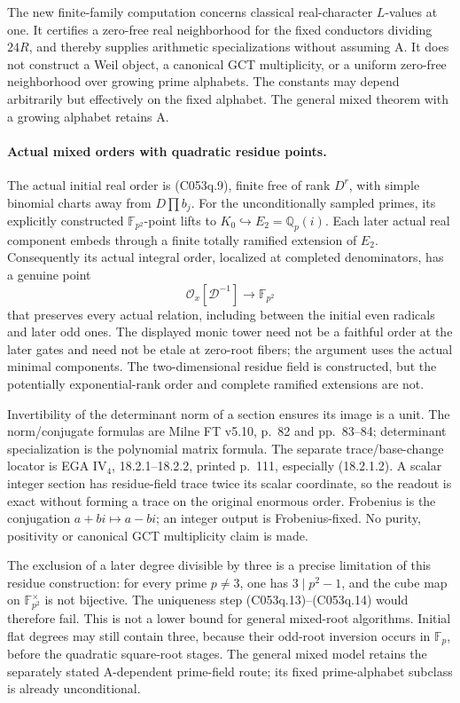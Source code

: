 \begin{geometricstatement}[NN-C053]
The new finite-family computation concerns classical
real-character \(L\)-values at one. It certifies a
zero-free real neighborhood for the fixed conductors
dividing \(24R\), and thereby supplies arithmetic
specializations without assuming A. It does not
construct a Weil object, a canonical GCT multiplicity,
or a uniform zero-free neighborhood over growing
prime alphabets. The constants may depend arbitrarily
but effectively on the fixed alphabet. The general
mixed theorem with a growing alphabet retains A.

\paragraph{Actual mixed orders with quadratic residue points.}
The actual initial real order is (C053q.9), finite
free of rank \(D^r\), with simple binomial charts
away from \(D\prod b_j\). For the unconditionally
sampled primes, its explicitly constructed
\(\mathbb F_{p^2}\)-point lifts to
\(K_0\hookrightarrow E_2=\mathbb Q_p(i)\).
Each later actual real component embeds through
a finite totally ramified extension of \(E_2\).
Consequently its actual integral order, localized
at completed denominators, has a genuine point
\[
             \mathcal O_x[\mathcal D^{-1}]
                           \longrightarrow\mathbb F_{p^2}
                                                               \tag{C053q.17}
\]
that preserves every actual relation, including
between the initial even radicals and later odd
ones. The displayed monic tower need not be a
faithful order at the later gates and need not
be etale at zero-root fibers; the argument uses
the actual minimal components. The two-dimensional
residue field is constructed, but the potentially
exponential-rank order and complete ramified
extensions are not.

Invertibility of the determinant norm of a section
ensures its image is a unit. The norm/conjugate
formulas are Milne FT v5.10, p.~82 and pp.~83--84;
determinant specialization is the polynomial
matrix formula. The separate trace/base-change
locator is EGA IV$_4$, 18.2.1--18.2.2, printed
p.~111, especially (18.2.1.2). A scalar integer
section has residue-field trace twice its scalar
coordinate, so the readout is exact without
forming a trace on the original enormous order.
Frobenius is the conjugation \(a+bi\mapsto a-bi\);
an integer output is Frobenius-fixed. No purity,
positivity or canonical GCT multiplicity claim
is made.

The exclusion of a later degree divisible by three
is a precise limitation of this residue construction:
for every prime \(p\ne3\), one has
\(3\mid p^2-1\), and the cube map on
\(\mathbb F_{p^2}^\times\) is not bijective.
The uniqueness step (C053q.13)--(C053q.14) would
therefore fail. This is not a lower bound for
general mixed-root algorithms. Initial flat
degrees may still contain three, because their
odd-root inversion occurs in \(\mathbb F_p\),
before the quadratic square-root stages. The
general mixed model retains the separately
stated A-dependent prime-field route; its fixed
prime-alphabet subclass is already unconditional.
\end{geometricstatement}

